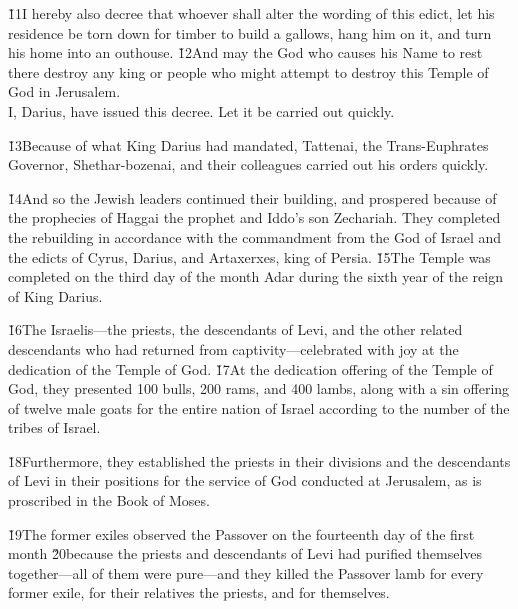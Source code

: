 \begin{poetry}
\poeml \v{11}I hereby also decree that whoever shall alter the wording of this edict, let his residence be torn down for timber to build a gallows, hang him on it, and turn his home into an outhouse. \v{12}And may the God who causes his Name to rest there destroy any king or people who might attempt to destroy this Temple of God in Jerusalem. \\
\poeml I, Darius, have issued this decree. Let it be carried out quickly.
\end{poetry}

\v{13}Because of what King Darius had mandated, Tattenai, the Trans-Euphrates Governor, Shethar-bozenai, and their colleagues carried out his orders quickly.

\v{14}And so the Jewish leaders continued their building, and prospered because of the prophecies of Haggai the prophet and Iddo's son Zechariah. They completed the rebuilding in accordance with the commandment from the God of Israel and the edicts of Cyrus, Darius, and Artaxerxes, king of Persia. \v{15}The Temple was completed on the third day of the month Adar during the sixth year of the reign of King Darius.

\v{16}The Israelis---the priests, the descendants of Levi, and the other related descendants who had returned from captivity---celebrated with joy at the dedication of the Temple of God. \v{17}At the dedication offering of the Temple of God, they presented 100 bulls, 200 rams, and 400 lambs, along with a sin offering of twelve male goats for the entire nation of Israel according to the number of the tribes of Israel.

\v{18}Furthermore, they established the priests in their divisions and the descendants of Levi in their positions for the service of God conducted at Jerusalem, as is proscribed in the Book of Moses.

\v{19}The former exiles observed the Passover on the fourteenth day of the first month \v{20}because the priests and descendants of Levi had purified themselves together---all of them were pure---and they killed the Passover lamb for every former exile, for their relatives the priests, and for themselves.

